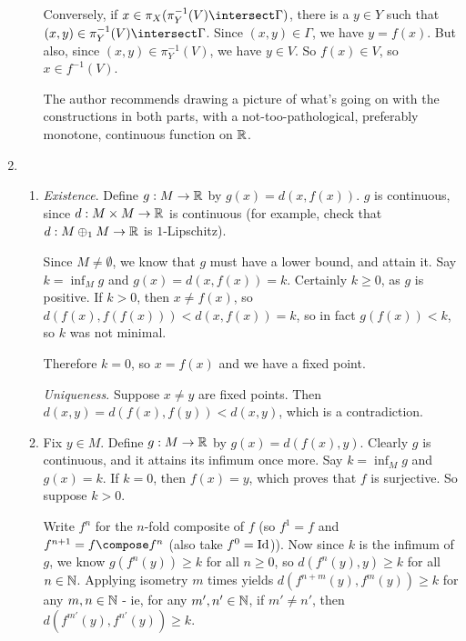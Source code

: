 \documentclass[a4paper,12pt,fleqn]{article}
\begin{document}
\begin{enumerate}[label=\arabic*.,leftmargin=*]
\begin{enumerate}[label=(\alph*)]
    Conversely, if \(x \in \pi_X(\pi_Y^{-1}(V) \intersect \Gamma)\), there
    is a \(y \in Y\) such that
    \((x, y) \in \pi_Y^{-1}(V) \intersect \Gamma\). Since \((x, y) \in \Gamma\),
    we have \(y = f(x)\). But also, since \((x, y) \in \pi_Y^{-1}(V)\), we have
    \(y \in V\). So \(f(x) \in V\), so \(x \in f^{-1}(V)\).
    \begin{remark}
     The author recommends drawing a picture of what's going on with the
     constructions in both parts, with a not-too-pathological, preferably
     monotone, continuous function on \(\mathbb R\).
    \end{remark}
  \end{enumerate}
 \item
  \begin{enumerate}[label=(\alph*)]
   \item
    \textit{Existence}. Define \(g: M \to \mathbb R\) by \(g(x) = d(x, f(x))\). \(g\)
    is continuous, since \(d: M \times M \to \mathbb R\) is continuous (for example,
    check that \(d: M \oplus_1 M \to \mathbb R\) is \(1\)-Lipschitz).

    Since \(M \ne \emptyset\), we know that \(g\) must have a lower bound, and
    attain it. Say \(k = \inf_M g\) and \(g(x) = d(x, f(x)) = k\). Certainly
    \(k \ge 0\), as \(g\) is positive. If \(k > 0\), then \(x \ne f(x)\), so
    \(d(f(x), f(f(x))) < d(x, f(x)) = k\), so in fact \(g(f(x)) < k\), so \(k\)
    was not minimal.

    Therefore \(k = 0\), so \(x = f(x)\) and we have a fixed point.

    \textit{Uniqueness}. Suppose \(x \ne y\) are fixed points. Then
    \(d(x, y) = d(f(x), f(y)) < d(x, y)\), which is a contradiction.
   \item
    Fix \(y \in M\). Define \(g: M \to \mathbb R\) by \(g(x) = d(f(x), y)\). Clearly
    \(g\) is continuous, and it attains its infimum once more. Say
    \(k = \inf_M g\) and \(g(x) = k\). If \(k = 0\), then \(f(x) = y\), which
    proves that \(f\) is surjective. So suppose \(k > 0\).

    Write \(f^n\) for the \(n\)-fold composite of \(f\) (so \(f^1 = f\) and
    \(f^{n + 1} = f \compose f^n\) (also take \(f^0 = \mathrm{Id}\))). Now since \(k\)
    is the infimum of \(g\), we know \(g(f^n(y)) \ge k\) for all \(n \ge 0\), so
    \(d(f^n(y), y) \ge k\) for all \(n \in \mathbb N\). Applying isometry \(m\)
    times yields \(d(f^{n + m}(y), f^m(y)) \ge k\) for any \(m, n \in \mathbb N\) - ie,
    for any \(m', n' \in \mathbb N\), if \(m' \ne n'\), then
    \(d(f^{m'}(y), f^{n'}(y)) \ge k\).


\end{enumerate}
\end{enumerate}
\end{document}
